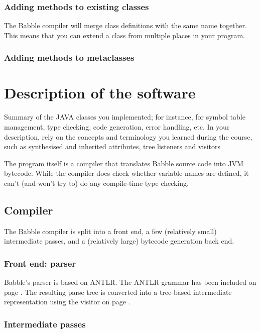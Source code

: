 \documentclass[a4paper]{article}
\begin{document}
\label{merge}
\subsubsection{Adding methods to existing classes}

The Babble compiler will merge class definitions with the same name together.
This means that you can extend a class from multiple places in your program.

\subsubsection{Adding methods to metaclasses}

\section{Description of the software}
Summary of the JAVA classes you implemented; for instance, for symbol
table management, type checking, code generation, error handling, etc. In your description, rely
on the concepts and terminology you learned during the course, such as synthesised and inherited
attributes, tree listeners and visitors

The program itself is a compiler that translates Babble source code into JVM bytecode.
While the compiler does check whether variable names are defined, it can't (and won't try to) do any compile-time type checking.

\subsection{Compiler}

The Babble compiler is split into a front end, a few (relatively small) intermediate passes, and a (relatively large) bytecode generation back end.

\subsubsection{Front end: parser}

Babble's parser is based on ANTLR.
The ANTLR grammar has been included on page \pageref{grammar}.
The resulting parse tree is converted into a tree-based intermediate representation using the visitor on page \pageref{visitor}.

\subsubsection{Intermediate passes}
\end{document}

